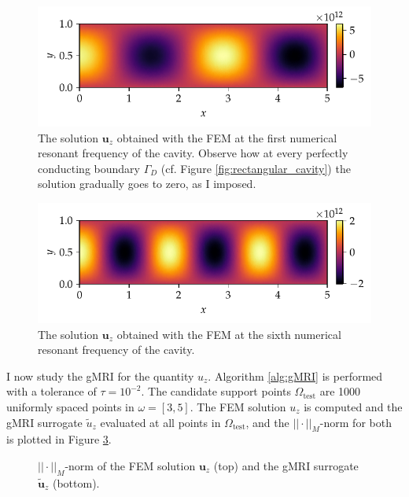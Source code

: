 \documentclass[11pt, a4paper]{article}
\begin{document}
\begin{figure}[ht]
    \centering
    \includegraphics{plots/rectangular_cavity_mode1.pdf}
    \caption{The solution $\mathbf{u}_z$ obtained with the \acrshort{FEM} at the
    first numerical resonant frequency of the cavity. Observe how at
    every perfectly conducting boundary $\Gamma_D$ (cf. Figure
    \ref{fig:rectangular_cavity}) the solution gradually goes to zero, as I imposed.}
    \label{fig:rectangular-cavity-mode1}
\end{figure}

\begin{figure}[ht]
    \centering
    \includegraphics{plots/rectangular_cavity_mode5.pdf}
    \caption{The solution $\mathbf{u}_z$ obtained with the \acrshort{FEM} at the
    sixth numerical resonant frequency of the cavity.}
    \label{fig:rectangular-cavity-mode5}
\end{figure}

I now study the \acrshort{gMRI} for the quantity $u_z$.
Algorithm \ref{alg:gMRI} is performed with a tolerance of $\tau = 10^{-2}$.
The candidate support points $\Omega_{\mathrm{test}}$
are 1000 uniformly spaced points in $\omega = [3, 5]$. The \acrshort{FEM} solution $u_z$
is computed and the \acrshort{gMRI} surrogate $\tilde{u}_z$ evaluated at all points in $\Omega_{\mathrm{test}}$,
and the $||\cdot||_M$-norm for both is plotted in Figure \ref{fig:rectangular-cavity-norms}. 

\begin{figure}[ht]
    \centering
    
    \caption{$||\cdot||_M$-norm of the \acrshort{FEM} solution $\mathbf{u}_z$ (top) and the 
    \acrshort{gMRI} surrogate $\mathbf{\tilde{u}}_z$ (bottom).}
    \label{fig:rectangular-cavity-norms}
\end{figure}
\end{document}
